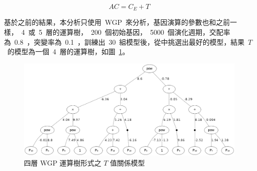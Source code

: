 
\begin{equation} AC = C_E + T  \label{eq:AC}\end{equation}

基於之前的結果，本分析只使用~WGP~來分析，基因演算的參數也和之前一樣，~4~或~5~層的運算樹，~200~個初始基因，~5000~個演化週期，交配率為~0.8~，突變率為~0.1~，訓練出~30~組模型後，從中挑選出最好的模型，結果~$T$~的模型為一個~4~層的運算樹，如圖~\ref{fig:4LWGPTuning}。

\begin{figure}[hbtp]
  \begin{center}
    \includegraphics[width=1.0\textwidth]{figures/4-layer-wgp.png}
    \caption{四層 WGP 運算樹形式之 $T$ 值關係模型}
    \label{fig:4LWGPTuning}
  \end{center}
\end{figure}


